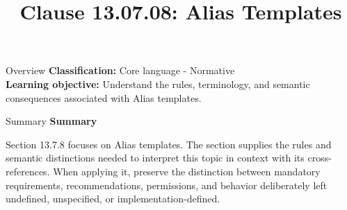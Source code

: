 \documentclass[10pt,letterpaper]{article}
\title{Clause 13.07.08: Alias Templates}
\author{}
\date{}
\begin{document}
\maketitle
\begin{CornellOverviewBox}{Overview}
\textbf{Classification:} Core language - Normative\\[2pt]
\textbf{Learning objective:} Understand the rules, terminology, and semantic consequences associated with Alias templates.
\end{CornellOverviewBox}\begin{CornellSummaryBox}{Summary}
{\sffamily\bfseries\color{Accent} Summary}\par\vspace{3pt}Section 13.7.8 focuses on Alias templates. The section supplies the rules and semantic distinctions needed to interpret this topic in context with its cross-references. When applying it, preserve the distinction between mandatory requirements, recommendations, permissions, and behavior deliberately left undefined, unspecified, or implementation-defined.
\end{CornellSummaryBox}
\end{document}
